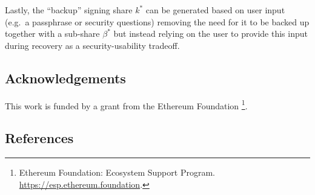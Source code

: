 \documentclass[
]{article}
\begin{document}
Lastly, the ``backup'' signing share \(k^ \ast\) can be generated based
on user input (e.g.~a passphrase or security questions) removing the
need for it to be backed up together with a sub-share \(\beta ^ \ast\)
but instead relying on the user to provide this input during recovery as
a security-usability tradeoff.

\hypertarget{acknowledgements}{%
\subsection{Acknowledgements}\label{acknowledgements}}

This work is funded by a grant from the Ethereum Foundation \footnote{Ethereum
  Foundation: Ecosystem Support Program.
  \url{https://esp.ethereum.foundation}.}.

\hypertarget{references}{%
\subsection{References}\label{references}}
\end{document}
